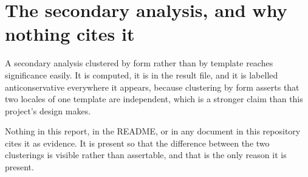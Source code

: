 \section{The secondary analysis, and why nothing cites it}

A secondary analysis clustered by form rather than by template reaches
significance easily. It is computed, it is in the result file, and it is labelled
anticonservative everywhere it appears, because clustering by form asserts that
two locales of one template are independent, which is a stronger claim than this
project's design makes.

Nothing in this report, in the README, or in any document in this repository
cites it as evidence. It is present so that the difference between the two
clusterings is visible rather than assertable, and that is the only reason it is
present.
